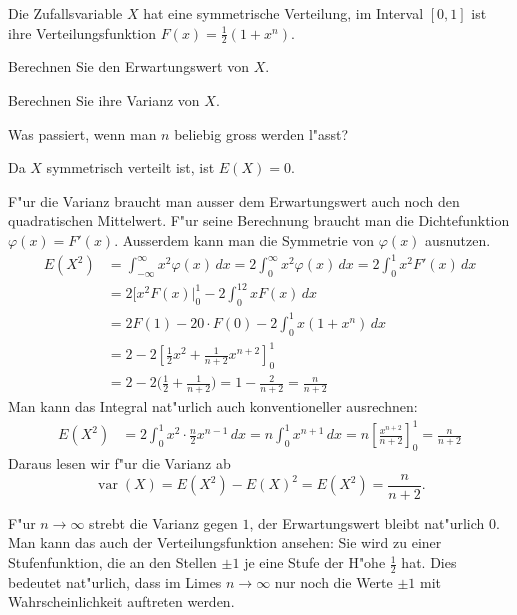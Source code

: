 Die Zufallsvariable $X$ hat eine symmetrische Verteilung, im
Interval $[0,1]$ ist ihre Verteilungsfunktion $F(x)=\frac12(1+x^n)$.
\begin{teilaufgaben}
\item
Berechnen Sie den Erwartungswert von $X$.
\item
Berechnen Sie ihre Varianz von $X$.
\item
Was passiert, wenn man $n$ beliebig gross werden l"asst?
\end{teilaufgaben}

\begin{loesung}
\begin{teilaufgaben}
\item Da $X$ symmetrisch verteilt ist, ist $E(X)=0$.
\item
F"ur die Varianz braucht man ausser dem Erwartungswert auch noch
den quadratischen Mittelwert.  F"ur seine Berechnung braucht man die
Dichtefunktion $\varphi(x)=F'(x)$. Ausserdem kann man die Symmetrie
von $\varphi(x)$ ausnutzen.
\begin{align*}
E(X^2)
&=
\int_{-\infty}^{\infty}x^2\varphi(x)\,dx
=
2\int_{0}^{\infty}x^2\varphi(x)\,dx
=2\int_0^1 x^2 F'(x)\,dx\\
&=
2[x^2F(x)|_0^1-2\int_0^12xF(x)\,dx
\\
&=
2F(1)-20\cdot F(0)-2\int_0^1x(1+x^n)\,dx
\\
&=
2-2\left[
\frac12x^2+\frac1{n+2}x^{n+2}
\right]_0^1
\\
&=
2-2\biggl(\frac12+\frac1{n+2}\biggr)
=
1-\frac{2}{n+2}
=
\frac{n}{n+2}
\end{align*}
Man kann das Integral nat"urlich auch konventioneller ausrechnen:
\begin{align*}
E(X^2)&=2\int_0^1x^2\cdot\frac{n}2x^{n-1}\,dx
=
n\int_0^1x^{n+1}\,dx=n\left[\frac{x^{n+2}}{n+2}\right]_0^1
=\frac{n}{n+2}
\end{align*}
Daraus lesen wir f"ur die Varianz ab
\[
\operatorname{var}(X)=E(X^2)-E(X)^2=E(X^2)=\frac{n}{n+2}.
\]
\item
F"ur $n\to\infty$ strebt die Varianz gegen $1$, der Erwartungswert
bleibt nat"urlich $0$. Man kann das auch der Verteilungsfunktion
ansehen: Sie wird zu einer Stufenfunktion, die an den Stellen
$\pm 1$ je eine Stufe der H"ohe $\frac12$ hat. Dies bedeutet
nat"urlich, dass im Limes $n\to\infty$ nur noch die Werte $\pm1$ mit
Wahrscheinlichkeit auftreten werden.
\qedhere
\end{teilaufgaben}
\end{loesung}

